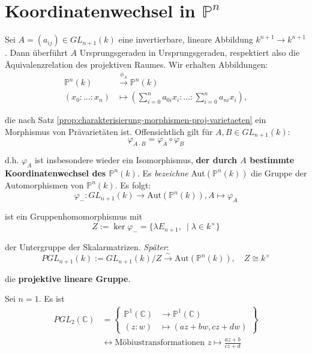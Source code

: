 
\section{Koordinatenwechsel in $\mathbb{P}^{n}$}
\label{sec:koordinatenwechsel-projektiver-raum}

Sei $A=(a_{ij})\in GL_{n+1}(k)$ eine invertierbare, lineare Abbildung $k^{n+1}\rightarrow k^{n+1}$. Dann überführt $A$ Ursprungsgeraden in Ursprungsgeraden, respektiert also die Äquivalenzrelation des projektiven Raumes. Wir erhalten Abbildungen:
\begin{align*}
  \mathbb{P}^{n}(k) & \overset{\phi_{A}}{\longrightarrow}\mathbb{P}^{n}(k)\\
  (x_{0}:\ldots:x_{n}) & \longmapsto\left(\sum_{i=0}^{n}a_{0i}x_{i}:\ldots:\sum_{i=0}^{n}a_{ni}x_{i}\right),
\end{align*}

die nach Satz \ref{prop:charakterisierung-morphismen-proj-varietaeten} ein Morphismus von Prävarietäten ist. Offensichtlich
gilt für $A,B\in GL_{n+1}(k)$:
\[
  \varphi_{A\cdot B}=\varphi_{A}\circ\varphi_{B}
\]

d.h. $\varphi_{A}$ ist insbesondere wieder ein Isomorphismus, \textbf{der
  durch $A$ bestimmte Koordinatenwechsel des $\mathbb{P}^{n}(k)$}.
Es \emph{bezeichne} Aut$(\mathbb{P}^{n}(k))$ die Gruppe der Automorphismen
von $\mathbb{P}^{n}(k)$. Es folgt:
\[
  \varphi_{-}:GL_{n+1}(k)\rightarrow\text{Aut}(\mathbb{P}^{n}(k)), A \mapsto \varphi_{A}
\]

ist ein Gruppenhomomorphismus mit 
\[
  Z:=\ker\varphi_{-}=\{\lambda E_{n+1},\ \mid \lambda\in k^{\times}\}
\]

der Untergruppe der Skalarmatrizen. \emph{Später}:
\[
  PGL_{n+1}(k):=GL_{n+1}(k)/Z\overset{\sim}\longrightarrow\text{Aut}(\mathbb{P}^{n}(k)),\quad Z\cong k^{\times}
\]

die \textbf{projektive lineare Gruppe}.
\begin{example*}
Sei $n=1$. Es ist
\begin{align*}
PGL_{2}(\mathbb{C}) & =\left\{ \begin{array}{rl}
\mathbb{P}^{1}(\mathbb{C}) & \rightarrow\mathbb{P}^{1}(\mathbb{C})\\
(z:w) & \mapsto(az+bw,cz+dw)
\end{array}\right\} \\
 & \leftrightarrow\text{Möbiustransformationen }z\mapsto\frac{az+b}{cz+d}
\end{align*}
\end{example*}

